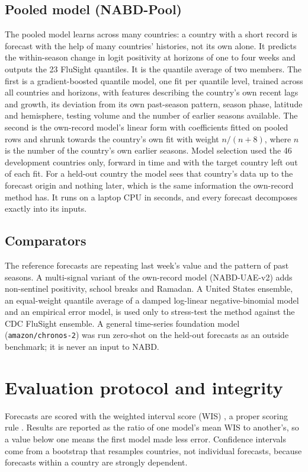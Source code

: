 \documentclass[11pt,a4paper]{article}
\begin{document}
\subsection{Pooled model (NABD-Pool)}
The pooled model learns across many countries: a country with a short record is forecast with the help of many countries' histories, not its own alone. It predicts the within-season change in logit positivity at horizons of one to four weeks and outputs the 23 FluSight quantiles. It is the quantile average of two members. The first is a gradient-boosted quantile model, one fit per quantile level, trained across all countries and horizons, with features describing the country's own recent lags and growth, its deviation from its own past-season pattern, season phase, latitude and hemisphere, testing volume and the number of earlier seasons available. The second is the own-record model's linear form with coefficients fitted on pooled rows and shrunk towards the country's own fit with weight $n/(n+8)$, where $n$ is the number of the country's own earlier seasons. Model selection used the 46 development countries only, forward in time and with the target country left out of each fit. For a held-out country the model sees that country's data up to the forecast origin and nothing later, which is the same information the own-record method has. It runs on a laptop CPU in seconds, and every forecast decomposes exactly into its inputs.

\subsection{Comparators}
The reference forecasts are repeating last week's value and the pattern of past seasons. A multi-signal variant of the own-record model (NABD-UAE-v2) adds non-sentinel positivity, school breaks and Ramadan. A United States ensemble, an equal-weight quantile average of a damped log-linear negative-binomial model and an empirical error model, is used only to stress-test the method against the CDC FluSight ensemble. A general time-series foundation model (\texttt{amazon/\allowbreak chronos-2}) was run zero-shot on the held-out forecasts as an outside benchmark; it is never an input to NABD.

\section{Evaluation protocol and integrity}

Forecasts are scored with the weighted interval score (WIS) \cite{bracher2021}, a proper scoring rule \cite{gneiting2007}. Results are reported as the ratio of one model's mean WIS to another's, so a value below one means the first model made less error. Confidence intervals come from a bootstrap that resamples countries, not individual forecasts, because forecasts within a country are strongly dependent.
\end{document}
